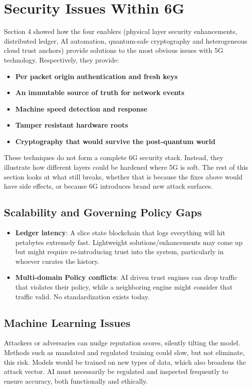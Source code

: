 \documentclass[acmtog]{acmart}
\begin{document}
\section{Security Issues Within 6G}
Section 4 showed how the four enablers (physical layer security enhancements, distributed ledger, AI automation, quantum-safe cryptography and heterogeneous cloud trust anchors) provide solutions to the most obvious issues with 5G technology. Respectively, they provide:
\begin{itemize}
  \item \textbf{Per packet origin authentication and fresh keys} 
  \item \textbf{An immutable source of truth for network events} 
  \item \textbf{Machine speed detection and response} 
  \item \textbf{Tamper resistant hardware roots} 
  \item \textbf{Cryptography that would survive the post-quantum world} 
\end{itemize}
These techniques do not form a complete 6G security stack. Instead, they illustrate how different layers could be hardened where 5G is soft. The rest of this section looks at what still breaks, whether that is because the fixes above would have side effects, or because 6G introduces brand new attack surfaces.

\subsection{Scalability and Governing Policy Gaps}
\begin{itemize}
  \item \textbf{Ledger latency}: A slice state blockchain that logs everything will hit petabytes extremely fast. Lightweight solutions/enhancements may come up but might require re-introducing trust into the system, particularly in whoever curates the history.
  \item \textbf{Multi-domain Policy conflicts}: AI driven trust engines can drop traffic that violates their policy, while a neighboring engine might consider that traffic valid. No standardization exists today.
\end{itemize}

\subsection{Machine Learning Issues}
Attackers or adversaries can nudge reputation scores, silently tilting the model. Methods such as mandated and regulated training could slow, but not eliminate, this risk. Models would be trained on new types of data, which also broadens the attack vector. AI must necessarily be regulated and inspected frequently to ensure accuracy, both functionally and ethically.
\end{document}

